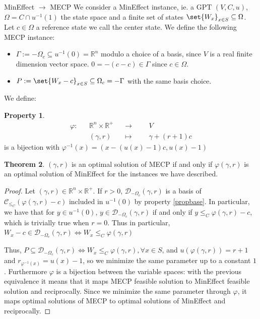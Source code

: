 \documentclass{article}
\theoremstyle{definition}
\newtheorem{theo}{Theorem}[section]
\newtheorem{prop}[theo]{Property}
\theoremstyle{remark}
\begin{document}
\begin{subsubsection}{MinEffect $\rightarrow$ MECP}
  We consider a MinEffect instance, ie. a GPT $(V,C,u)$, $\Omega = C \cap u^{-1}(1)$ the state space and a finite set of states $\set{W_x}_{x \in S} \subseteq \Omega$. Let $c \in \Omega$ a reference state we call the center state. We define the following MECP instance:
  \begin{itemize}
  \item $\Gamma := -\Omega_c \subseteq u^{-1}(0) = \mathbb{R}^n$ modulo a choice of a basis, since $V$ is a real finite dimension vector space. $0 = -(c-c) \in \Gamma$ since $c \in \Omega$.
  \item $P := \set{W_x-c}_{x \in S} \subseteq \Omega_c = -\Gamma $ with the same basis choice.
  \end{itemize}

  We define:
  \begin{prop}
  \begin{equation}
    \begin{aligned}
      \varphi : && \mathbb{R}^n\times \mathbb{R}^+ &&\rightarrow&&& V\\
      && (\gamma,r) &&\mapsto&&& \gamma + (r+1)c
    \end{aligned}
  \end{equation}
  is a bijection with $\varphi^{-1}(x)=(x-(u(x)-1)c,u(x)-1)$
  \end{prop}

  \begin{theo}
    $(\gamma,r)$ is an optimal solution of MECP if and only if $\varphi(\gamma,r)$ is an optimal solution of MinEffect for the instances we have described.
    \label{eqtheo}
  \end{theo}

  \begin{proof}
    Let $(\gamma,r) \in \mathbb{R}^n\times \mathbb{R}^+$. If $r>0$, $\mathcal{D}_{-\Omega_c}(\gamma,r)$ is a basis of $\mathcal{C}_{\leq_C}(\varphi(\gamma,r)-c)$ included in $u^{-1}(0)$ by property \ref{propbase}. In particular, we have that for $y \in u^{-1}(0)$, $y \in \mathcal{D}_{-\Omega_c}(\gamma,r)$ if and only if $y \leq_C \varphi(\gamma,r) - c$, which is trivially true when $r=0$. Thus in particular, $W_x - c \in \mathcal{D}_{-\Omega_c}(\gamma,r) \iff W_x \leq_C \varphi(\gamma,r)$

    Thus, $P \subseteq \mathcal{D}_{-\Omega_c}(\gamma,r) \iff W_x \leq_C \varphi(\gamma,r), \forall x \in S$, and $u(\varphi(\gamma,r)) = r+1$ and $r_{\varphi^{-1}(x)} = u(x)-1$, so we minimize the same parameter up to a constant $1$. Furthermore $\varphi$ is a bijection between the variable spaces: with the previous equivalence it means that it maps MECP feasible solution to MinEffect feasible solution and reciprocally. Since we minimize the same parameter through $\varphi$, it maps optimal solutions of MECP to optimal solutions of MinEffect and reciprocally.
  \end{proof}
\end{subsubsection}
\end{document}
